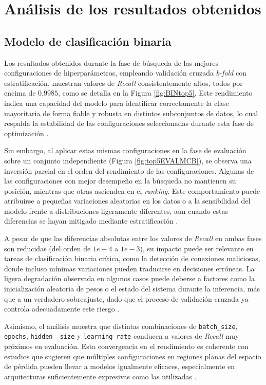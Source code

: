 \section{Análisis de los resultados obtenidos} \label{sec:analEVAL}
\subsection{Modelo de clasificación binaria}

Los resultados obtenidos durante la fase de búsqueda de las mejores configuraciones de hiperparámetros, empleando validación cruzada \textit{k-fold} con estratificación, muestran valores de \textit{Recall} consistentemente altos, todos por encima de $0{.}9985$, como se detalla en la Figura \ref{fig:BINtop5}. Este rendimiento indica una capacidad del modelo para identificar correctamente la clase mayoritaria de forma fiable y robusta en distintos subconjuntos de datos, lo cual respalda la estabilidad de las configuraciones seleccionadas durante esta fase de optimización \cite{bergstra2012random}.

Sin embargo, al aplicar estas mismas configuraciones en la fase de evaluación sobre un conjunto independiente (Figura \ref{fig:top5EVALMCB}), se observa una inversión parcial en el orden del rendimiento de las configuraciones. Algunas de las configuraciones con mejor desempeño en la búsqueda no mantienen su posición, mientras que otras ascienden en el \textit{ranking}. Este comportamiento puede atribuirse a pequeñas variaciones aleatorias en los datos o a la sensibilidad del modelo frente a distribuciones ligeramente diferentes, aun cuando estas diferencias se hayan mitigado mediante estratificación \cite{reimers2017optimal}.

A pesar de que las diferencias absolutas entre los valores de \textit{Recall} en ambas fases son reducidas (del orden de $1e-4$ a $1e-3$), su impacto puede ser relevante en tareas de clasificación binaria crítica, como la detección de conexiones maliciosas, donde incluso mínimas variaciones pueden traducirse en decisiones erróneas. La ligera degradación observada en algunos casos puede deberse a factores como la inicialización aleatoria de pesos o el estado del sistema durante la inferencia, más que a un verdadero sobreajuste, dado que el proceso de validación cruzada ya controla adecuadamente este riesgo \cite{goodfellow2016deep}.

Asimismo, el análisis muestra que distintas combinaciones de \texttt{batch\_size}, \texttt{epochs}, \texttt{hidden \_size} y \texttt{learning\_rate} conducen a valores de \textit{Recall} muy próximos en evaluación. Esta convergencia en el rendimiento es coherente con estudios que sugieren que múltiples configuraciones en regiones planas del espacio de pérdida pueden llevar a modelos igualmente eficaces, especialmente en arquitecturas suficientemente expresivas como las utilizadas \cite{bouthillier2021sloppy}.

